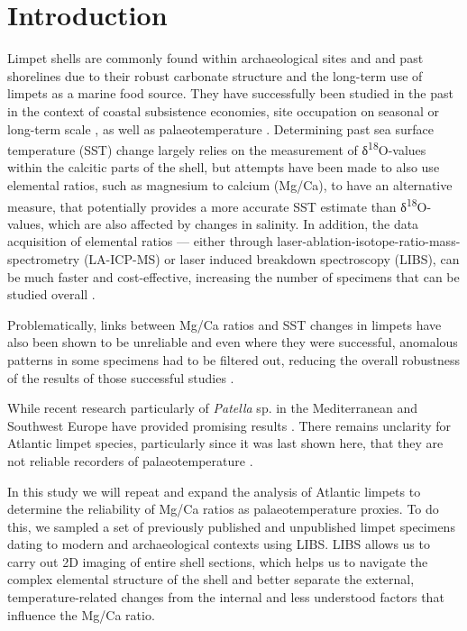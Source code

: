 \documentclass[
  authoryear,
  preprint,
  3p]{elsarticle}
\begin{document}
\section{Introduction}\label{Introduction}

Limpet shells are commonly found within archaeological sites and and
past shorelines due to their robust carbonate structure and the
long-term use of limpets as a marine food source. They have successfully
been studied in the past in the context of coastal subsistence
economies, site occupation on seasonal
\citep{Shackleton1973-ij, Parker2018-wf, Bosch2018-ud} or long-term
scale \citep{Ortiz2015-mr}, as well as palaeotemperature
\citep{Fenger2007-gf, Surge2012-ba, Wang2012-ee, Colonese2012-ct, Ferguson2011-zl}.
Determining past sea surface temperature (SST) change largely relies on
the measurement of δ\textsuperscript{18}O-values within the calcitic
parts of the shell, but attempts have been made to also use elemental
ratios, such as magnesium to calcium (Mg/Ca), to have an alternative
measure, that potentially provides a more accurate SST estimate than
δ\textsuperscript{18}O-values, which are also affected by changes in
salinity. In addition, the data acquisition of elemental ratios ---
either through laser-ablation-isotope-ratio-mass-spectrometry
(LA-ICP-MS) or laser induced breakdown spectroscopy (LIBS), can be much
faster and cost-effective, increasing the number of specimens that can
be studied overall \citep{Durham2017-fh, Hausmann2023-ih}.

Problematically, links between Mg/Ca ratios and SST changes in limpets
have also been shown to be unreliable \citep{Graniero2015-zv} and even
where they were successful, anomalous patterns in some specimens had to
be filtered out, reducing the overall robustness of the results of those
successful studies \citep{Ferguson2011-zl}.

While recent research particularly of \emph{Patella} sp. in the
Mediterranean and Southwest Europe have provided promising results
\citep{Hausmann2019-fi, Garcia-Escarzaga2015-jc, Garcia-Escarzaga2018-nf}.
There remains unclarity for Atlantic limpet species, particularly since
it was last shown here, that they are not reliable recorders of
palaeotemperature \citep{Graniero2015-zv}.

In this study we will repeat and expand the analysis of Atlantic limpets
to determine the reliability of Mg/Ca ratios as palaeotemperature
proxies. To do this, we sampled a set of previously published and
unpublished limpet specimens dating to modern and archaeological
contexts using LIBS. LIBS allows us to carry out 2D imaging of entire
shell sections, which helps us to navigate the complex elemental
structure of the shell and better separate the external,
temperature-related changes from the internal and less understood
factors that influence the Mg/Ca ratio.
\end{document}
